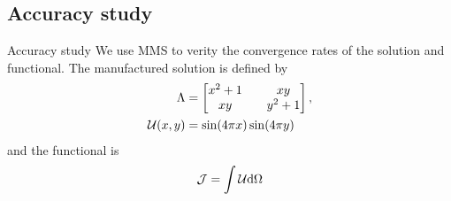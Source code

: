 \documentclass{beamer}
\begin{document}
\subsection{Accuracy study}
\begin{frame}{Accuracy study}
    We use MMS to verity the convergence rates of the solution and functional. The manufactured solution is defined by
    \begin{equation*}
    \begin{aligned}
    \Lambda &= \begin{bmatrix}
    x^2+1 && xy \\ xy && y^2+1
    \end{bmatrix}, \\
    \mathcal{U}(x,y) &= \sin(4\pi x)\sin(4\pi y)
    \end{aligned}
    \end{equation*}
    and the functional is
    \begin{equation*}
    \mathcal{J} = \int \mathcal{U} \mathrm{d} \Omega
    \end{equation*}
\end{frame}
\end{document}
